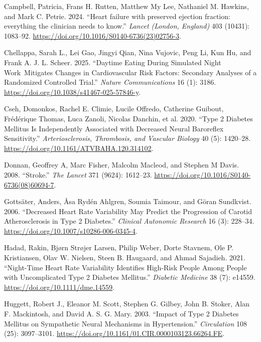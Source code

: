 \documentclass[
  a4paper,
  headsepline=true,
  open=any]{scrbook}
\newlength{\cslhangindent}
\newlength{\cslentryspacingunit} %
\newenvironment{CSLReferences}[2] %
 {%
  \setlength{\parindent}{0pt}
  \ifodd #1
  \let\oldpar\par
  \def\par{\hangindent=\cslhangindent\oldpar}
  \fi
  \setlength{\parskip}{#2\cslentryspacingunit}
 }%
 {}
\begin{document}
\begin{CSLReferences}{1}{0}
\leavevmode{}%
Campbell, Patricia, Frans H. Rutten, Matthew My Lee, Nathaniel M.
Hawkins, and Mark C. Petrie. 2024. {``Heart failure with preserved
ejection fraction: everything the clinician needs to know.''}
\emph{Lancet (London, England)} 403 (10431): 1083--92.
\url{https://doi.org/10.1016/S0140-6736(23)02756-3}.

\leavevmode{}%
Chellappa, Sarah L., Lei Gao, Jingyi Qian, Nina Vujovic, Peng Li, Kun
Hu, and Frank A. J. L. Scheer. 2025. {``Daytime Eating During Simulated
Night Work~Mitigates Changes in Cardiovascular Risk Factors: Secondary
Analyses of a Randomized Controlled Trial.''} \emph{Nature
Communications} 16 (1): 3186.
\url{https://doi.org/10.1038/s41467-025-57846-y}.

\leavevmode{}%
Cseh, Domonkos, Rachel E. Climie, Lucile Offredo, Catherine Guibout,
Frédérique Thomas, Luca Zanoli, Nicolas Danchin, et al. 2020. {``Type 2
Diabetes Mellitus Is Independently Associated with Decreased Neural
Baroreflex Sensitivity.''} \emph{Arteriosclerosis, Thrombosis, and
Vascular Biology} 40 (5): 1420--28.
\url{https://doi.org/10.1161/ATVBAHA.120.314102}.

\leavevmode{}%
Donnan, Geoffrey A, Marc Fisher, Malcolm Macleod, and Stephen M Davis.
2008. {``Stroke.''} \emph{The Lancet} 371 (9624): 1612--23.
\url{https://doi.org/10.1016/S0140-6736(08)60694-7}.

\leavevmode{}%
Gottsäter, Anders, Åsa Rydén Ahlgren, Soumia Taimour, and Göran
Sundkvist. 2006. {``Decreased Heart Rate Variability May Predict the
Progression of Carotid Atherosclerosis in Type 2 Diabetes.''}
\emph{Clinical Autonomic Research} 16 (3): 228--34.
\url{https://doi.org/10.1007/s10286-006-0345-4}.

\leavevmode{}%
Hadad, Rakin, Bjørn Strøjer Larsen, Philip Weber, Dorte Stavnem, Ole P.
Kristiansen, Olav W. Nielsen, Steen B. Haugaard, and Ahmad Sajadieh.
2021. {``Night-Time Heart Rate Variability Identifies High-Risk People
Among People with Uncomplicated Type 2 Diabetes Mellitus.''}
\emph{Diabetic Medicine} 38 (7): e14559.
\url{https://doi.org/10.1111/dme.14559}.

\leavevmode{}%
Huggett, Robert J., Eleanor M. Scott, Stephen G. Gilbey, John B. Stoker,
Alan F. Mackintosh, and David A. S. G. Mary. 2003. {``Impact of Type 2
Diabetes Mellitus on Sympathetic Neural Mechanisms in Hypertension.''}
\emph{Circulation} 108 (25): 3097--3101.
\url{https://doi.org/10.1161/01.CIR.0000103123.66264.FE}.


\end{CSLReferences}
\end{document}
